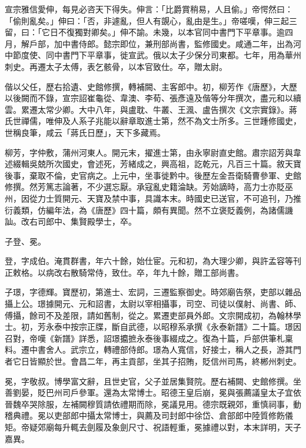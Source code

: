 \begin{pinyinscope}
 宣宗雅信愛伸，每見必咨天下得失。伸言：「比爵賞稍易，人且偷。」帝愕然曰：「偷則亂矣。」伸曰：「否，非遽亂，但人有覬心，亂由是生。」帝嗟嘆，伸三起三留，曰：「它日不復獨對卿矣。」伸不諭。未幾，以本官同中書門下平章事。逾四月，解戶部，加中書侍郎。懿宗即位，兼刑部尚書，監修國史。咸通二年，出為河中節度使、同中書門下平章事，徙宣武。俄以太子少保分司東都。七年，用為華州刺史。再遷太子太傅，表乞骸骨，以本官致仕。卒，贈太尉。



 偕以父任，歷右拾遺、史館修撰，轉補闕、主客郎中。初，柳芳作《唐歷》，大歷以後闕而不錄，宣宗詔崔龜從、韋澳、李荀、張彥遠及偕等分年撰次，盡元和以續雲。累遷太常少卿。大中八年，與盧耽、牛叢、王渢、盧告撰次《文宗實錄》。蔣氏世禪儒，唯伸及人系子兆能以辭章取進士第，然不為文士所多。三世踵修國史，世稱良筆，咸云「蔣氏日歷」，天下多藏焉。



 柳芳，字仲敷，蒲州河東人。開元末，擢進士第，由永寧尉直史館。肅宗詔芳與韋述綴輯吳兢所次國史，會述死，芳緒成之，興高祖，訖乾元，凡百三十篇。敘天寶後事，棄取不倫，史官病之。上元中，坐事徙黔中。後歷左金吾衛騎曹參軍、史館修撰。然芳篤志論著，不少選忘厭。承寇亂史籍淪缺。芳始謫時，高力士亦貶巫州，因從力士質開元、天寶及禁中事，具識本末。時國史已送官，不可追刊，乃推衍義類，仿編年法，為《唐歷》四十篇，頗有異聞。然不立褒貶義例，為諸儒譏訕。改右司郎中、集賢殿學士，卒。



 子登、冕。



 登，字成伯。淹貫群書，年六十餘，始仕宦。元和初，為大理少卿，與許孟容等刊正敕格。以病改右散騎常侍，致仕。卒，年九十餘，贈工部尚書。



 子璟，字德輝。寶歷初，第進士、宏詞，三遷監察御史。時郊廟告祭，吏部以雜品攝上公。璟據開元、元和詔書，太尉以宰相攝事，司空、司徒以僕射、尚書、師、傅攝，餘司不及差限，請如舊制，從之。累遷吏部員外郎。文宗開成初，為翰林學士。初，芳永泰中按宗正牒，斷自武德，以昭穆系承撰《永泰新譜》二十篇。璟因召對，帝嘆《新譜》詳悉，詔璟攟摭永泰後事綴成之。復為十篇，戶部供筆札稟料。遷中書舍人。武宗立，轉禮部侍郎。璟為人寬信，好接士，稱人之長，游其門者它日皆顯於世。會昌二年，再主貢部，坐其子招賄，貶信州司馬，終郴州刺史。



 冕，字敬叔。博學富文辭，且世史官，父子並居集賢院。歷右補闕、史館修撰。坐善劉晏，貶巴州司戶參軍。還為太常博士。昭德王皇后崩，冕與張薦議皇太子宜依晉魏卒哭除服，左補闕穆質請依禮期而除，冕議見用。德宗既親郊，重慎祠事，動稽典禮。冕以吏部郎中攝太常博士，與薦及司封郎中徐岱、倉部郎中陸質修飭儀矩。帝疑郊廟每升輒去劍履及象劍尺寸、祝語輕重，冕據禮以對，本末詳明，天子嘉異。




\end{pinyinscope}
